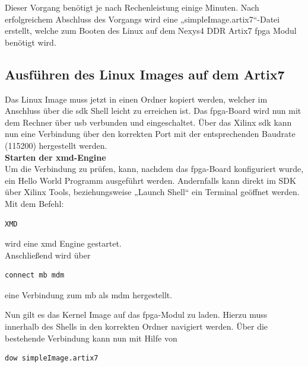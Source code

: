 Dieser Vorgang benötigt je nach Rechenleistung einige Minuten.
Nach erfolgreichem Abschluss des Vorgangs wird eine „simpleImage.artix7“-Datei erstellt,
welche zum Booten des Linux auf dem Nexys4 DDR Artix7 \ac{fpga} Modul benötigt wird.

\subsection{Ausführen des Linux Images auf dem Artix7}\label{kap:mcausführenlinux}



Das Linux Image muss jetzt in einen Ordner kopiert werden, welcher im Anschluss über
die \ac{sdk} Shell leicht zu erreichen ist. Das \ac{fpga}-Board wird nun mit dem Rechner über \ac{usb} verbunden und eingeschaltet.
 Über das Xilinx \ac{sdk} kann nun eine Verbindung über den korrekten Port mit der entsprechenden Baudrate (115200)
 hergestellt werden.\\

\textbf{Starten der \ac{xmd}-Engine}\\

Um die Verbindung zu prüfen, kann, nachdem das \ac{fpga}-Board konfiguriert wurde, ein Hello World Programm ausgeführt werden. Andernfalls kann direkt im SDK über Xilinx Tools, beziehungsweise  „Launch Shell“ ein Terminal geöffnet werden.\\

Mit dem Befehl:

\begin{lstlisting}[caption={Öffnen des \ac{xmd}},label={code:mbxmd}]
  XMD
   \end{lstlisting}


wird eine \ac{xmd} Engine gestartet.\\

Anschließend wird über\\
\begin{lstlisting}[caption={Herstellen der Verbindung zum \acl{mb}},label={code:mbtarget}]
connect mb mdm
   \end{lstlisting}

eine Verbindung zum \ac{mb} als \ac{mdm} hergestellt.

Nun gilt es das Kernel Image auf das \ac{fpga}-Modul zu laden.
Hierzu muss innerhalb des Shells in den korrekten Ordner navigiert werden.
Über die bestehende Verbindung kann nun mit Hilfe von
\begin{lstlisting}[caption={Download des Images},label={code:mbimage}]
  dow simpleImage.artix7
   \end{lstlisting}

